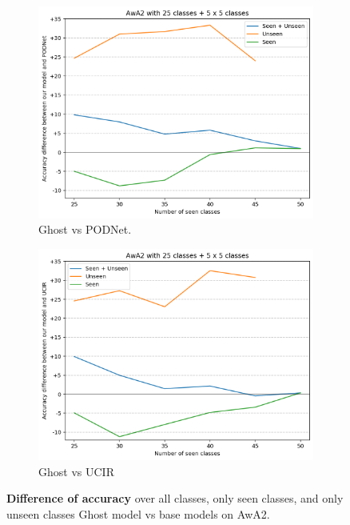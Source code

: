 \begin{figure}
    \centering
    \begin{subfigure}{0.45\linewidth}
        \centering
        \includegraphics[width=\linewidth]{images/ghost/plot_awa2_25x5x5c_podnet_diff.png}
        \caption{Ghost vs PODNet.}
    \end{subfigure}
    \begin{subfigure}{0.45\linewidth}
        \centering
        \includegraphics[width=\linewidth]{images/ghost/plot_awa2_25x5x5c_ucir_diff.png}
        \caption{Ghost vs UCIR}
    \end{subfigure}
    \caption{\textbf{Difference of accuracy} over all classes, only seen classes, and only unseen
        classes Ghost model vs base models on AwA2.}
    \label{fig:ghost_plot_awa2_25x5x5c}
\end{figure}

